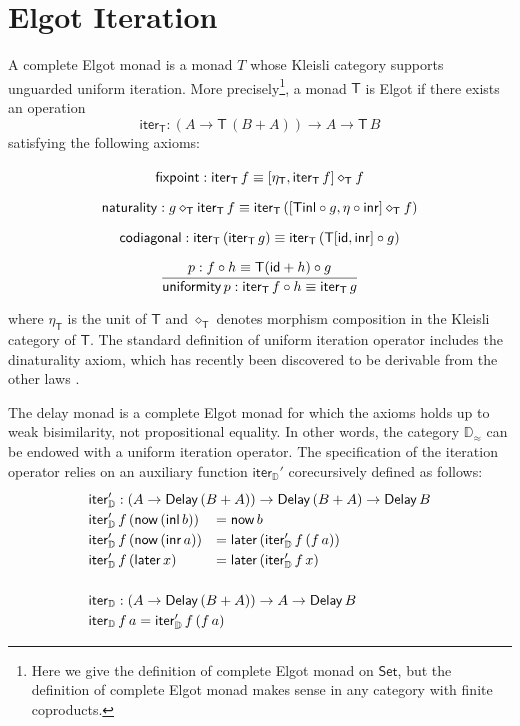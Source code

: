 \documentclass[runningheads,a4paper]{llncs}
\newcommand{\Set}{\mathsf{Set}}
\newcommand{\comp}{\circ}
\newcommand{\copair}[2]{[#1,#2]}
\newcommand{\inl}{\mathsf{inl}}
\newcommand{\inr}{\mathsf{inr}}
\newcommand{\T}{\mathsf{T}}
\newcommand{\iter}{\mathsf{iter}}
\newcommand{\id}{\mathsf{id}}
\newcommand{\Delay}{\ensuremath{\mathsf{Delay}\,}}
\newcommand{\now}{\mathsf{now}}
\newcommand{\later}{\mathsf{later}}
\newcommand{\D}{\mathbb{D}}
\newcommand{\Dapprox}{\mathbb{D}_{\approx}}
\newcommand{\iterD}{\mathsf{iter}_\D}
\begin{document}
\section{Elgot Iteration}\label{sec:elgot}

A complete Elgot monad \cite{GoncharovMR16,GoncharovSRJ18} is a monad $T$
whose Kleisli category supports unguarded uniform iteration. More
precisely\footnote{Here we give the definition of complete Elgot monad on
  $\Set$, but the definition of complete Elgot monad makes sense in any
  category with finite coproducts.}, a monad $\T$ is Elgot if there
exists an operation
\[
\iter_\T : (A \to \T \,(B + A)) \to A \to \T\,B
\]
satisfying the following axioms:
\[\arraycolsep=8pt\def\arraystretch{1.8}
\begin{array}{c}
\mathsf{fixpoint} :
\iter_\T\,f \equiv \copair {\eta_\T}{\iter_\T \,f} \diamond_\T f
\\
\mathsf{naturality} : g \diamond_\T \iter_\T\,f \equiv
  \iter_\T\,(\copair{\T \inl \comp g} {\eta \comp \inr} \diamond_\T f)
\\
\mathsf{codiagonal} :
\iter_\T \,(\iter_\T\,g) \equiv \iter_\T\,(\T \copair {\id} {\inr}
  \comp g)
\\[.25cm]
\infer{\mathsf{uniformity}\,p : \iter_\T \,f \comp h \equiv \iter_\T
  \,g}{p : f \comp h \equiv \T (\id + h) \comp g}
\end{array}
\]
where $\eta_\T$ is the unit of $\T$ and $\diamond_\T$ denotes morphism
composition in the Kleisli category of $\T$.
The standard definition of uniform iteration operator includes the
dinaturality axiom, which has recently been discovered to be derivable
from the other laws \cite{EsikG16,GoncharovMR16}.

The delay monad is a complete Elgot monad for which the axioms holds up to
weak bisimilarity, not propositional equality. In other words, the
category $\Dapprox$ can be endowed with a uniform iteration
operator. The specification of the iteration operator relies on an
auxiliary function $\iterD'$ corecursively defined as follows:
\[ %
\def\arraystretch{1.2}
\begin{array}{ll}
\multicolumn{2}{l}{\iterD' : (A \to \Delay (B + A)) \to \Delay (B + A) \to \Delay B} \\
\iterD' \,f \,(\now \,(\inl\, b)) &= \now \,b \\
\iterD' \,f \,(\now \,(\inr\, a)) &= \later \,(\iterD' \,f \,(f \,a)) \\
\iterD' \,f \,(\later \,x) &= \later \,(\iterD' \,f \,x) \\
 \\
\multicolumn{2}{l}{\iterD : (A \to \Delay (B + A)) \to A \to \Delay B} \\
\multicolumn{2}{l}{\iterD \,f \,a = \iterD' \,f \,(f \,a)}
\end{array}
\]
\end{document}
